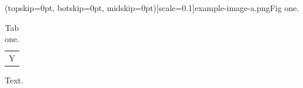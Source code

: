 \documentclass{ieeeaccess}
\begin{document}
\Figure[t!](topskip=0pt, botskip=0pt, midskip=0pt)[scale=0.1]{example-image-a.png}{Fig one.}
\begin{table}[h]\caption{Tab one.}\centering\begin{tabular}{c}Y\end{tabular}\end{table}
Text.\EOD
\end{document}
